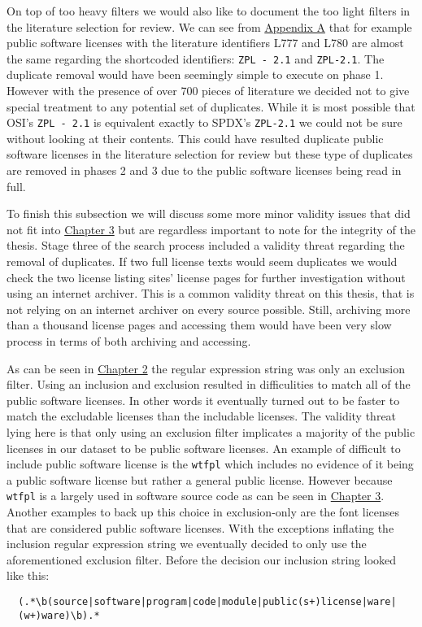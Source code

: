 On top of too heavy filters we would also like to document the too light filters in the literature selection for review. We can see from \hyperref[appendix:a]{Appendix A} that for example public software licenses with the literature identifiers L777 and L780 are almost the same regarding the shortcoded identifiers: \texttt{ZPL - 2.1} and \texttt{ZPL-2.1}. The duplicate removal would have been seemingly simple to execute on phase 1. However with the presence of over 700 pieces of literature we decided not to give special treatment to any potential set of duplicates. While it is most possible that OSI's \texttt{ZPL - 2.1} is equivalent exactly to SPDX's \texttt{ZPL-2.1} we could not be sure without looking at their contents. This could have resulted duplicate public software licenses in the literature selection for review but these type of duplicates are removed in phases 2 and 3 due to the public software licenses being read in full.

To finish this subsection we will discuss some more minor validity issues that did not fit into \hyperref[results]{Chapter 3} but are regardless important to note for the integrity of the thesis. Stage three of the search process included a validity threat regarding the removal of duplicates. If two full license texts would seem duplicates we would check the two license listing sites' license pages for further investigation without using an internet archiver. This is a common validity threat on this thesis, that is not relying on an internet archiver on every source possible. Still, archiving more than a thousand license pages and accessing them would have been very slow process in terms of both archiving and accessing.

As can be seen in  \hyperref[methods]{Chapter 2} the regular expression string was only an exclusion filter. Using an inclusion and exclusion resulted in difficulities to match all of the public software licenses. In other words it eventually turned out to be faster to match the excludable licenses than the includable licenses. The validity threat lying here is that only using an exclusion filter implicates a majority of the public licenses in our dataset to be public software licenses. An example of difficult to include public software license is the \texttt{wtfpl} which includes no evidence of it being a public software license but rather a general public license. However because \texttt{wtfpl} is a largely used in software source code as can be seen in \hyperref[results]{Chapter 3}. Another examples to back up this choice in exclusion-only are the font licenses that are considered public software licenses. With the exceptions inflating the inclusion regular expression string we eventually decided to only use the aforementioned exclusion filter. Before the decision our inclusion string looked like this:
\begin{verbatim}
  (.*\b(source|software|program|code|module|public(s+)license|ware|
  (w+)ware)\b).*
\end{verbatim}

